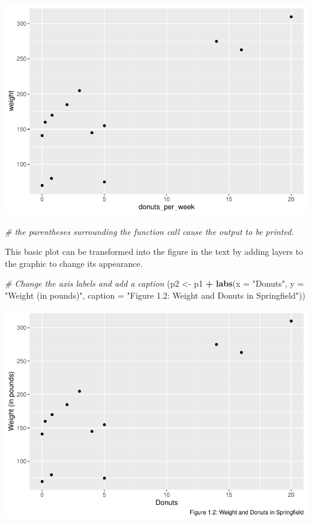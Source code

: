 \documentclass[]{book}
\newenvironment{Shaded}{\begin{snugshade}}{\end{snugshade}}
\newcommand{\CommentTok}[1]{\textcolor[rgb]{0.56,0.35,0.01}{\textit{#1}}}
\newcommand{\DataTypeTok}[1]{\textcolor[rgb]{0.13,0.29,0.53}{#1}}
\newcommand{\KeywordTok}[1]{\textcolor[rgb]{0.13,0.29,0.53}{\textbf{#1}}}
\newcommand{\NormalTok}[1]{#1}
\newcommand{\OperatorTok}[1]{\textcolor[rgb]{0.81,0.36,0.00}{\textbf{#1}}}
\newcommand{\StringTok}[1]{\textcolor[rgb]{0.31,0.60,0.02}{#1}}
\begin{document}
\includegraphics{bailey_files/figure-latex/figure1.2-1.pdf}

\begin{Shaded}
\begin{Highlighting}[]
\CommentTok{# the parentheses surrounding the function call cause the output to be printed.}
\end{Highlighting}
\end{Shaded}

This basic plot can be transformed into the figure in the text by adding layers to the graphic to change its appearance.

\begin{Shaded}
\begin{Highlighting}[]
\CommentTok{# Change the axis labels and add a caption}
\NormalTok{(p2 <-}\StringTok{ }\NormalTok{p1 }\OperatorTok{+}\StringTok{ }\KeywordTok{labs}\NormalTok{(}\DataTypeTok{x =} \StringTok{"Donuts"}\NormalTok{, }\DataTypeTok{y =} \StringTok{"Weight (in pounds)"}\NormalTok{, }\DataTypeTok{caption =} \StringTok{"Figure 1.2: Weight and Donuts in Springfield"}\NormalTok{)) }
\end{Highlighting}
\end{Shaded}

\includegraphics{bailey_files/figure-latex/unnamed-chunk-3-1.pdf}
\end{document}
